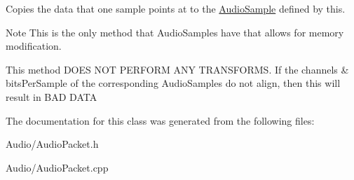 Copies the data that one sample points at to the \hyperlink{class_d_x_1_1_audio_1_1_audio_sample}{Audio\-Sample} defined by this. 

\begin{DoxyNote}{Note}
This is the only method that Audio\-Samples have that allows for memory modification. 

This method D\-O\-E\-S N\-O\-T P\-E\-R\-F\-O\-R\-M A\-N\-Y T\-R\-A\-N\-S\-F\-O\-R\-M\-S. If the channels \& bits\-Per\-Sample of the corresponding Audio\-Samples do not align, then this will result in B\-A\-D D\-A\-T\-A 
\end{DoxyNote}


The documentation for this class was generated from the following files\-:\begin{DoxyCompactItemize}
\item 
Audio/Audio\-Packet.\-h\item 
Audio/Audio\-Packet.\-cpp\end{DoxyCompactItemize}
